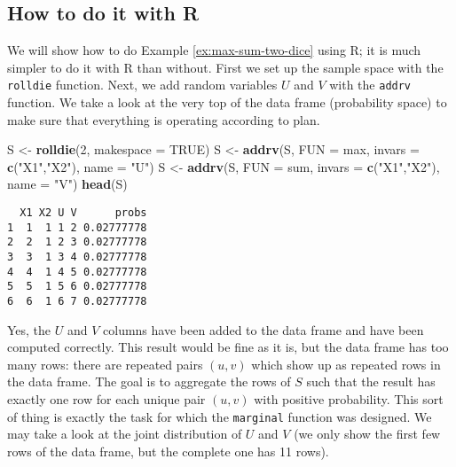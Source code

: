 \documentclass[]{book}
\newenvironment{Shaded}{\begin{snugshade}}{\end{snugshade}}
\newcommand{\KeywordTok}[1]{\textcolor[rgb]{0.13,0.29,0.53}{\textbf{{#1}}}}
\newcommand{\DataTypeTok}[1]{\textcolor[rgb]{0.13,0.29,0.53}{{#1}}}
\newcommand{\DecValTok}[1]{\textcolor[rgb]{0.00,0.00,0.81}{{#1}}}
\newcommand{\StringTok}[1]{\textcolor[rgb]{0.31,0.60,0.02}{{#1}}}
\newcommand{\OtherTok}[1]{\textcolor[rgb]{0.56,0.35,0.01}{{#1}}}
\newcommand{\NormalTok}[1]{{#1}}
\numberwithin{equation}{chapter}
\numberwithin{figure}{chapter}
\theoremstyle{plain}
\theoremstyle{definition}
\theoremstyle{remark}
\theoremstyle{definition}
\theoremstyle{definition}
\theoremstyle{remark}
\begin{document}
\subsection{How to do it with R}\label{how-to-do-it-with-r-28}

We will show how to do Example \ref{ex:max-sum-two-dice} using R; it is
much simpler to do it with R than without. First we set up the sample
space with the \texttt{rolldie} function. Next, we add random variables
\(U\) and \(V\) with the \texttt{addrv} function. We take a look at the
very top of the data frame (probability space) to make sure that
everything is operating according to plan.

\begin{Shaded}
\begin{Highlighting}[]
\NormalTok{S <-}\StringTok{ }\KeywordTok{rolldie}\NormalTok{(}\DecValTok{2}\NormalTok{, }\DataTypeTok{makespace =} \OtherTok{TRUE}\NormalTok{)}
\NormalTok{S <-}\StringTok{ }\KeywordTok{addrv}\NormalTok{(S, }\DataTypeTok{FUN =} \NormalTok{max, }\DataTypeTok{invars =} \KeywordTok{c}\NormalTok{(}\StringTok{"X1"}\NormalTok{,}\StringTok{"X2"}\NormalTok{), }\DataTypeTok{name =} \StringTok{"U"}\NormalTok{)}
\NormalTok{S <-}\StringTok{ }\KeywordTok{addrv}\NormalTok{(S, }\DataTypeTok{FUN =} \NormalTok{sum, }\DataTypeTok{invars =} \KeywordTok{c}\NormalTok{(}\StringTok{"X1"}\NormalTok{,}\StringTok{"X2"}\NormalTok{), }\DataTypeTok{name =} \StringTok{"V"}\NormalTok{)}
\KeywordTok{head}\NormalTok{(S)}
\end{Highlighting}
\end{Shaded}

\begin{verbatim}
  X1 X2 U V      probs
1  1  1 1 2 0.02777778
2  2  1 2 3 0.02777778
3  3  1 3 4 0.02777778
4  4  1 4 5 0.02777778
5  5  1 5 6 0.02777778
6  6  1 6 7 0.02777778
\end{verbatim}

Yes, the \(U\) and \(V\) columns have been added to the data frame and
have been computed correctly. This result would be fine as it is, but
the data frame has too many rows: there are repeated pairs \((u,v)\)
which show up as repeated rows in the data frame. The goal is to
aggregate the rows of \(S\) such that the result has exactly one row for
each unique pair \((u,v)\) with positive probability. This sort of thing
is exactly the task for which the \texttt{marginal} function was
designed. We may take a look at the joint distribution of \(U\) and
\(V\) (we only show the first few rows of the data frame, but the
complete one has 11 rows).
\end{document}
